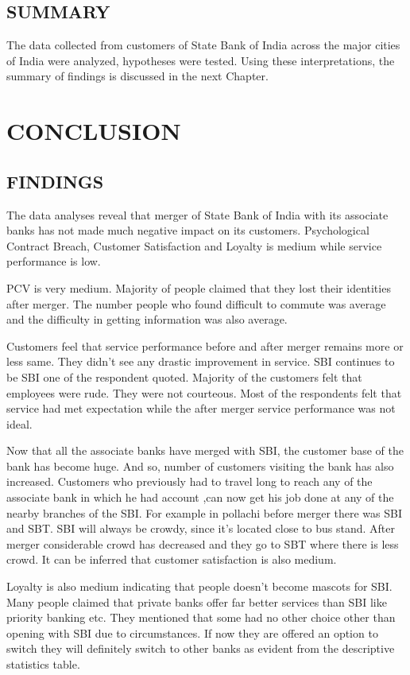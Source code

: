 \documentclass[a4paper, 12pt]{extarticle}
\begin{document}
{\subsection{SUMMARY}

The data collected from customers of State Bank of India across the major cities of India were analyzed, hypotheses were tested. Using these interpretations, the summary of findings is discussed in the next Chapter.

\newpage
\section{CONCLUSION}
\subsection{FINDINGS}
The data analyses reveal that merger of State Bank of India with its associate banks has not made much negative impact on its customers. Psychological Contract Breach, Customer Satisfaction and Loyalty is medium while service performance is low.

PCV is very medium. Majority of people claimed that they lost their identities after merger. The number people who found difficult to commute was average and the difficulty in getting information was also average.

Customers feel that service performance before and after merger remains more or less same. They didn't see any drastic improvement in service. SBI continues to be SBI one of the respondent quoted. Majority of the customers felt that employees were rude. They were not courteous. Most of the respondents felt that service had met expectation while the after merger service performance was not ideal.

Now that all the associate banks have merged with SBI, the customer base of the bank has become huge. And so, number of customers visiting the bank has also increased. Customers who previously had to travel long to reach any of the associate bank in which he had account ,can now get his job done at any of the nearby branches of the SBI. For example in pollachi before merger there was SBI and SBT. SBI will always be crowdy, since it's located close to bus stand. After merger considerable crowd has decreased and they go to SBT where there is less crowd. It can be inferred that customer satisfaction is also medium.

Loyalty is also medium indicating that people doesn't become mascots for SBI. Many people claimed that private banks offer far better services than SBI like priority banking etc. They mentioned that some had no other choice other than opening with SBI due to circumstances. If now they are offered an option to switch they will definitely switch to other banks as evident from the descriptive statistics table.

}
\end{document}
